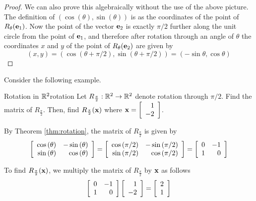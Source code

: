 \begin{proof}
We can also prove this algebraically without the use of the
above picture. The definition of $\left(
\cos \left( \theta \right) ,\sin \left( \theta \right) \right) $ is as the 
coordinates of the point of $R_{\theta}({\bf e}_{1})$.  Now the point of
the vector ${\bf e}_{2}$ is exactly $\pi /2$ further along the unit circle from 
the point of ${\bf e}_{1}$, and therefore after rotation through an angle of $\theta $ the coordinates
$x$ and $y$ of the point of $R_{\theta}({\bf e}_{2})$ are given by
\begin{equation*}
\left( x,y\right) =\left( \cos \left( \theta +\pi /2\right) ,\sin \left(
\theta +\pi /2\right) \right) =\left( -\sin \theta ,\cos \theta \right) 
\end{equation*}

\end{proof}

Consider the following example. 

\begin{example}{Rotation in $\mathbb{R}^2$}{rotation}
Let $R_{\frac{\pi}{2}}: \mathbb{R}^2 \to \mathbb{R}^2$ denote rotation through $\pi/2$. Find the matrix of $R_{\frac{\pi}{2}}$. Then, find $R_{\frac{\pi}{2}} ({\bf x})$ where ${\bf x} = \left[
\begin{array}{r}
1 \\
-2
\end{array}
\right]$. 
\end{example}

\begin{solution}
By Theorem \ref{thm:rotation}, the matrix of $R_{\frac{\pi}{2}}$ is given by
\[
\left[
\begin{array}{rr}
\cos \left( \theta \right) & -\sin \left( \theta \right) \\
\sin \left( \theta \right) & \cos \left( \theta \right)
\end{array}
\right]
=
\left[
\begin{array}{rr}
\cos \left( \pi/2 \right) & -\sin \left( \pi/2 \right) \\
\sin \left( \pi/2 \right) & \cos \left( \pi/2 \right)
\end{array}
\right]
=
\left[
\begin{array}{rr}
0 & -1 \\
1 & 0 
\end{array}
\right]
\]

To find $R_{\frac{\pi}{2}} ({\bf x})$, we multiply the matrix of $R_{\frac{\pi}{2}}$ by ${\bf x}$ as follows
\[
\left[
\begin{array}{rr}
0 & -1 \\
1 & 0 
\end{array}
\right]
\left[
\begin{array}{r}
1 \\
-2 
\end{array}
\right]
=
\left[
\begin{array}{r}
2 \\
1
\end{array}
\right]
\]

\end{solution}

